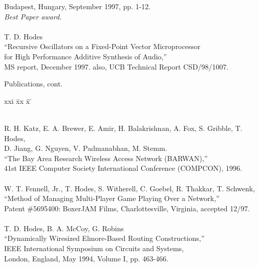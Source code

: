 \begin{tabbing}
\>\>        Budapest, Hungary, September 1997, pp. 1-12. \\
\>\>        {\em Best Paper award. }\\
\smallskip \\[-3pt]
\>    T. D. Hodes \\
\>\>      ``Recursive Oscillators on a Fixed-Point Vector Microprocessor \\
\>\>\>     for High Performance Additive Synthesis of Audio,'' \\
\>\>       MS report, December 1997. also, UCB Technical Report CSD/98/1007. \\

\end{tabbing}
\newpage
\begin{bf} \large
Publications, cont.
\end{bf}
\begin{tabbing}
xxi \= xx \= x \= \kill

\smallskip \\[-3pt]
\>    R. H. Katz, E. A. Brewer, E. Amir, H. Balakrishnan, A. Fox,
       S. Gribble, T. Hodes, \\
\>\>\>   D. Jiang, G. Nguyen, V. Padmanabhan, M. Stemm. \\
\>\> ``The Bay Area Research Wireless Access Network (BARWAN),''  \\
\>\> 41st IEEE Computer Society International Conference (COMPCON), 1996. \\
\smallskip \\
\>	W. T. Fennell, Jr., T. Hodes, S. Witherell, C. Goebel, 
	R. Thakkar, T. Schwenk, \\
\>\>	``Method of Managing Multi-Player Game Playing Over a Network,''  \\
\>\>	Patent \#5695400: BoxerJAM Films, Charlottesville, Virginia, accepted 12/97.  \\
\smallskip \\
\>    T. D. Hodes, B. A. McCoy, G. Robins \\
\>\>  ``Dynamically Wiresized Elmore-Based Routing Constructions,''  \\
\> IEEE International Symposium on Circuits and Systems, \\
\>\>   London, England, May 1994, Volume I, pp. 463-466. \\
\smallskip \\
\end{tabbing}


